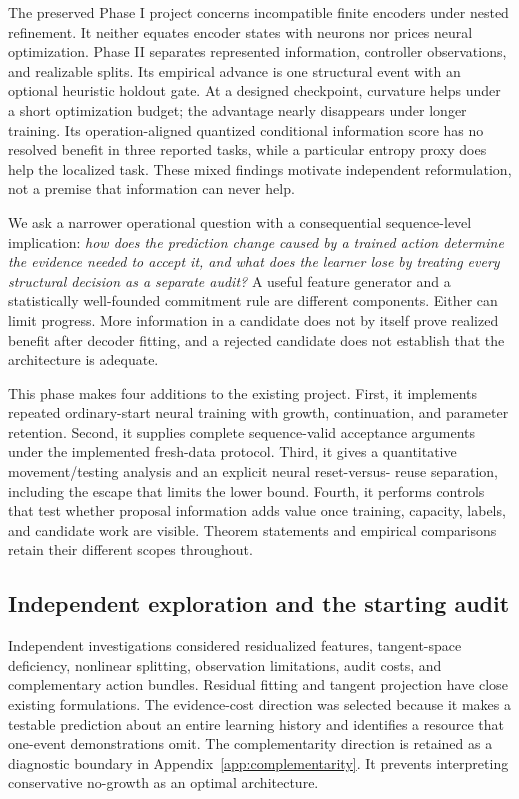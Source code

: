 \documentclass[11pt]{article}
\theoremstyle{remark}\newtheorem{remark}[theorem]{Remark}
\begin{document}
The preserved Phase I project concerns incompatible finite encoders under
nested refinement. It neither equates encoder states with neurons nor prices
neural optimization. Phase II separates represented information, controller
observations, and realizable splits. Its empirical advance is one structural
event with an optional heuristic holdout gate. At a designed checkpoint,
curvature helps under a short optimization budget; the advantage nearly
disappears under longer training. Its operation-aligned quantized conditional
information score has no resolved benefit in three reported tasks, while a
particular entropy proxy does help the localized task. These mixed findings
motivate independent reformulation, not a premise that information can never
help.

We ask a narrower operational question with a consequential sequence-level
implication: \emph{how does the prediction change caused by a trained action
determine the evidence needed to accept it, and what does the learner lose
by treating every structural decision as a separate audit?} A useful feature
generator and a statistically well-founded commitment rule are different
components. Either can limit progress. More information in a candidate does
not by itself prove realized benefit after decoder fitting, and a rejected
candidate does not establish that the architecture is adequate.

This phase makes four additions to the existing project. First, it implements
repeated ordinary-start neural training with growth, continuation, and
parameter retention. Second, it supplies complete sequence-valid acceptance
arguments under the implemented fresh-data protocol. Third, it gives a
quantitative movement/testing analysis and an explicit neural reset-versus-
reuse separation, including the escape that limits the lower bound. Fourth,
it performs controls that test whether proposal information adds value once
training, capacity, labels, and candidate work are visible. Theorem statements
and empirical comparisons retain their different scopes throughout.

\subsection{Independent exploration and the starting audit}
Independent investigations considered residualized features, tangent-space
deficiency, nonlinear splitting, observation limitations, audit costs, and
complementary action bundles. Residual fitting and tangent projection have
close existing formulations. The evidence-cost direction was selected because
it makes a testable prediction about an entire learning history and identifies
a resource that one-event demonstrations omit. The complementarity direction
is retained as a diagnostic boundary in Appendix~\ref{app:complementarity}.
It prevents interpreting conservative no-growth as an optimal architecture.
\end{document}
